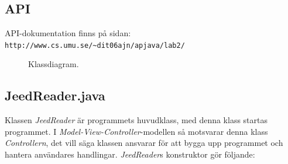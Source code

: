 \documentclass[titlepage, twoside, a4paper, 12pt]{article}
\begin{document}
\subsection{API}
API-dokumentation finns på sidan:\\
\verb!http://www.cs.umu.se/~dit06ajn/apjava/lab2/!

\newpage
\begin{figure}[H]
  \begin{center}
    \caption{Klassdiagram.}
    \label{fig:classUML}
  \end{center}
\end{figure}

\subsection{JeedReader.java}\label{JeedReader}
Klassen \textit{JeedReader} är programmets huvudklass, med denna klass
startas programmet. I \textit{Model-View-Controller}-modellen så
motsvarar denna klass \textit{Controllern}, det vill säga klassen
ansvarar för att bygga upp programmet och hantera användares
handlingar. \textit{JeedReader}s konstruktor gör följande:
\end{document}
